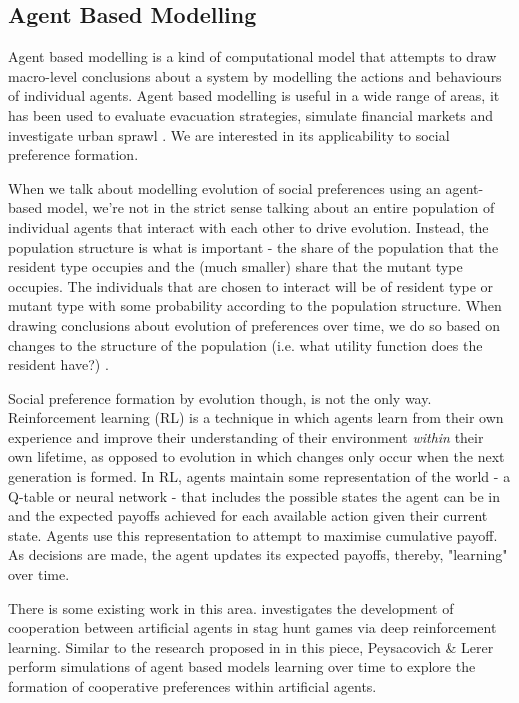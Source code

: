\documentclass[11pt]{article}
\newcommand*{\np}{\par\noindent\newline}
\begin{document}
\subsection{Agent Based Modelling}\label{abm}
Agent based modelling is a kind of computational model that attempts to draw
macro-level conclusions about a system by modelling the actions and behaviours
of individual agents. Agent based modelling is useful in a wide range of areas,
it has been used to evaluate evacuation strategies\cite{taylor_agent-based_2014},
simulate financial markets \cite{deissenberg_eurace:_2008} and investigate
urban sprawl \cite{brown_effects_2006}. We are interested in its applicability
to social preference formation.

\np When we talk about modelling evolution of social preferences using an
agent-based model, we're not in the strict sense talking about an entire
population of individual agents that interact with each other to drive
evolution. Instead, the population structure is what is important - the share
of the population that the resident type occupies and the (much smaller) share
that the mutant type occupies. The individuals that are chosen to interact will
be of resident type or mutant type with some probability according to the
population structure. When drawing conclusions about evolution of preferences
over time, we do so based on changes to the structure of the population (i.e.
what utility function does the resident have?) \cite{shoham_multiagent_nodate}.

\np Social preference formation by evolution though, is not the only way.
Reinforcement learning (RL) is a technique in which agents learn from their own
experience and improve their understanding of their environment \textit{within}
their own lifetime, as opposed to evolution in which changes only occur when
the next generation is formed. In RL, agents maintain some representation of
the world - a Q-table or neural network - that includes the possible states the
agent can be in and the expected payoffs achieved for each available action
given their current state. Agents use this representation to attempt to
maximise cumulative payoff. As decisions are made, the agent updates its expected payoffs, thereby, "learning" over time.

\np There is some existing work in this area. \cite{peysakhovich_prosocial_2017}
investigates the development of cooperation between artificial agents in stag
hunt games via deep reinforcement learning. Similar to the research proposed in
in this piece, Peysacovich \& Lerer perform simulations of agent based models
learning over time to explore the formation of cooperative preferences within
artificial agents.
\end{document}
